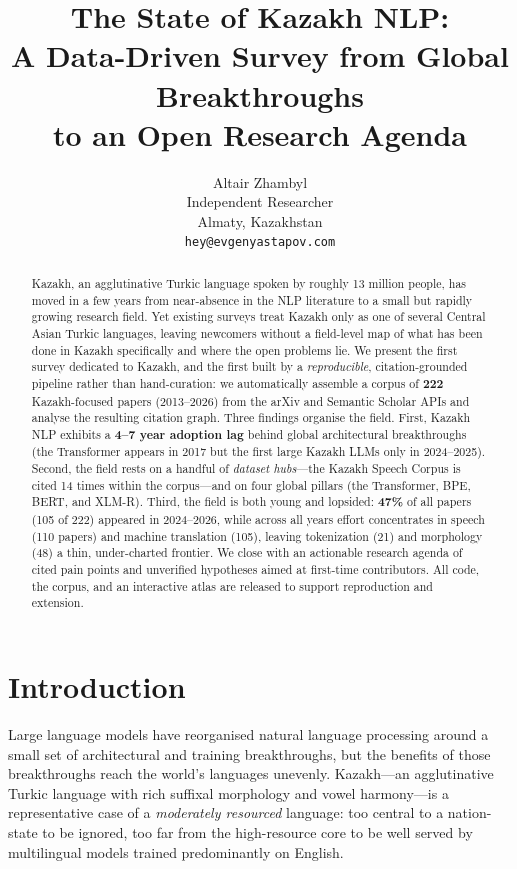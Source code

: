 \documentclass{article}
\title{
  The State of Kazakh NLP: \\
  A Data-Driven Survey from Global Breakthroughs \\
  to an Open Research Agenda
}
\author{
  Altair Zhambyl \\
  Independent Researcher \\
  Almaty, Kazakhstan \\
  \texttt{hey@evgenyastapov.com}
}
\begin{document}
\maketitle

\begin{abstract}
Kazakh, an agglutinative Turkic language spoken by roughly 13 million people, has
moved in a few years from near-absence in the NLP literature to a small but rapidly
growing research field. Yet existing surveys treat Kazakh only as one of several Central
Asian Turkic languages, leaving newcomers without a field-level map of what has been done
in Kazakh specifically and where the open problems lie. We present the first survey
dedicated to Kazakh, and the first built by a \emph{reproducible}, citation-grounded
pipeline rather than hand-curation: we automatically assemble a corpus of \textbf{222}
Kazakh-focused papers
(2013--2026) from the arXiv and Semantic Scholar APIs and analyse the resulting
citation graph. Three findings organise the field. First, Kazakh NLP exhibits a
\textbf{4--7 year adoption lag} behind global architectural breakthroughs (the
Transformer appears in 2017 but the first large Kazakh LLMs only in 2024--2025).
Second, the field rests on a handful of \emph{dataset hubs}---the Kazakh Speech Corpus
is cited 14 times within the corpus---and on four global pillars (the Transformer, BPE,
BERT, and XLM-R). Third, the field is both young and lopsided: \textbf{47\%} of all
papers (105 of 222) appeared in 2024--2026, while across all years effort concentrates in
speech (110 papers) and machine translation (105), leaving tokenization (21) and
morphology (48) a thin, under-charted frontier. We close with an actionable
research agenda of cited pain points and unverified hypotheses aimed at first-time
contributors. All code, the corpus, and an interactive atlas are released to support
reproduction and extension.
\end{abstract}

\section{Introduction}
Large language models have reorganised natural language processing around a small set
of architectural and training breakthroughs, but the benefits of those breakthroughs
reach the world's languages unevenly. Kazakh---an agglutinative Turkic language with
rich suffixal morphology and vowel harmony---is a representative case of a
\emph{moderately resourced} language: too central to a nation-state to be ignored,
too far from the high-resource core to be well served by multilingual models trained
predominantly on English.
\end{document}
